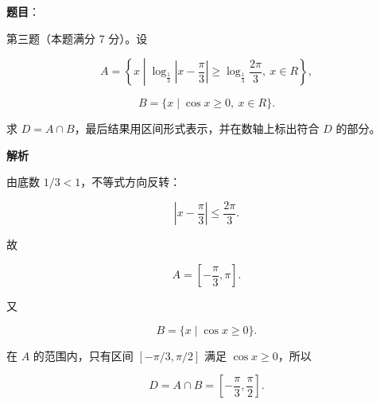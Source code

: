 \begin{answer}

\textbf{题目}：

第三题（本题满分 7 分）。设

\nopagebreak[4]
\[
A=\left\{x\middle|\log_{\frac13}\left|x-\frac\pi3\right|
\geq\log_{\frac13}\frac{2\pi}{3},\ x\in R\right\},
\]

\nopagebreak[4]
\[
B=\{x\mid\cos x\geq0,\ x\in R\}.
\]

求 $D=A\cap B$，最后结果用区间形式表示，并在数轴上标出符合 $D$ 的部分。

\textbf{解析}

由底数 $1/3<1$，不等式方向反转：

\nopagebreak[4]
\[
\left|x-\frac\pi3\right|\le\frac{2\pi}{3}.
\]

故

\nopagebreak[4]
\[
A=\left[-\frac\pi3,\pi\right].
\]

又

\nopagebreak[4]
\[
B=\{x\mid\cos x\ge0\}.
\]

在 $A$ 的范围内，只有区间 $\left[-\pi/3,\pi/2\right]$ 满足 $\cos x\ge0$，所以

\nopagebreak[4]
\[
D=A\cap B=\left[-\frac\pi3,\frac\pi2\right].
\]


\end{answer}
